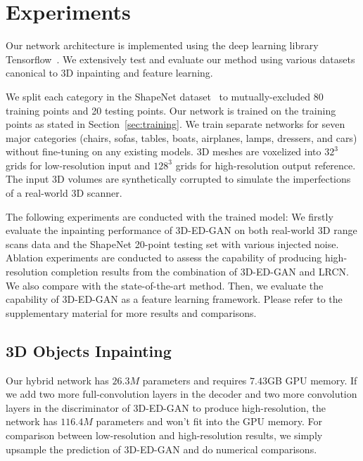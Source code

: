 \documentclass[10pt,twocolumn,letterpaper]{article}
\begin{document}
\section{Experiments}
\label{sec:experiment}

Our network architecture is implemented using the deep learning library Tensorflow~\cite{tensorflow}. We extensively test and evaluate our method using various datasets canonical to 3D inpainting and feature learning.

We split each category in the ShapeNet dataset~\cite{shapenet} to mutually-excluded 80 training points and 20 testing points. Our network is trained on the training points as stated in Section~\ref{sec:training}. We train separate networks for seven major categories (chairs, sofas, tables, boats, airplanes, lamps, dressers, and cars) without fine-tuning on any existing models. 3D meshes are voxelized into $32^3$ grids for low-resolution input and $128^3$ grids for high-resolution output reference. The input 3D volumes are synthetically corrupted to simulate the imperfections of a real-world 3D scanner.

The following experiments are conducted with the trained model: We firstly evaluate the inpainting performance of 3D-ED-GAN on both real-world 3D range scans data and the ShapeNet 20-point testing set with various injected noise. Ablation experiments are conducted to assess the capability of producing high-resolution completion results from the combination of 3D-ED-GAN and LRCN. We also compare with the state-of-the-art method. Then, we evaluate the capability of 3D-ED-GAN as a feature learning framework. Please refer to the supplementary material for more results and comparisons.

\subsection{3D Objects Inpainting}%
Our hybrid network has $26.3M$ parameters and requires $7.43$GB GPU memory. If we add two more full-convolution layers in the decoder and two more convolution layers in the discriminator of 3D-ED-GAN to produce high-resolution, the network has $116.4M$ parameters and won't fit into the GPU memory. For comparison between low-resolution and high-resolution results, we simply upsample the prediction of 3D-ED-GAN and do numerical comparisons. 
\end{document}
